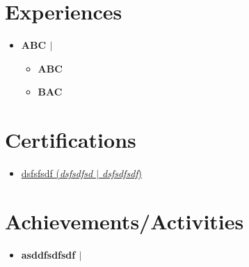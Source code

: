 \documentclass[letterpaper,5pt]{article}
\begin{document}
        \section{Experiences}
        \begin{itemize}[leftmargin=0.15in,label={}]
        
          \item{}
            \textbf{ABC $|$ \emph{}}  \hfill 
            \begin{itemize}
            \vspace{-5pt}
            \item[\textbullet{}]\textbf{ABC}  
            \vspace{-5pt}
            \item[\textbullet{}]\textbf{BAC}      

            \end{itemize}
          
      \end{itemize}
      
    
    
        \section{Certifications}
          \begin{itemize}[leftmargin=0.45in,label={}]
          
              \item[\textbullet{}]\href{}{dsfsfsdf (\emph{dsfsdfsd $|$ dsfsdfsdf})} \faExternalLink
              \newline 
              \vspace{-20pt}
          \vspace{8pt}
          \end{itemize}
      
    
    
          \section{Achievements/Activities}
          \begin{itemize}[leftmargin=0.15in, label={}]
          \item[]
          
            \textbf{asddfsdfsdf $|$ \emph{} } \hfill{}

                \hspace{0.15in}
                \ 
                \newline

                \vspace{-10pt} 
                
                
            \end{itemize}
          
      
\end{document}
